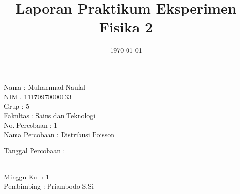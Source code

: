 \documentclass{article}
\title{Laporan Praktikum Eksperimen Fisika 2}
\author{  }
\date{  }
\begin{document}
	\begin{titlepage}
		\maketitle 
		\thispagestyle{empty}
		\noindent \huge{Nama\hspace{3.91cm} : Muhammad Naufal}\\
		\huge{NIM\hspace{4.3cm} : 11170970000033}\\
		\huge{Grup\hspace{4.13cm} : 5}\\
		\huge{Fakultas\hspace{3.2cm} : Sains dan Teknologi}\\
		\huge{No. Percobaan\hspace{1.28cm} : 1}\\
		\huge{Nama Percobaan \hspace{0.4cm} : Distribusi Poisson}\\
		\huge{Tanggal Percobaan : \date{\today}}\\
		\huge{Minggu Ke- \hspace{1.9cm} : 1}\\
		\huge{Pembimbing \hspace{1.75cm} : Priambodo S.Si}\\
	\end{titlepage}
\end{document}
